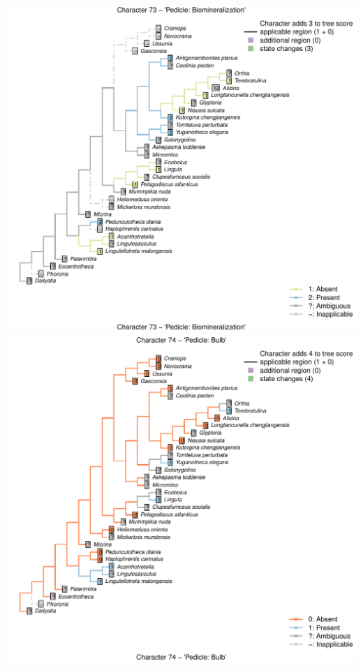 \documentclass[]{book}
\theoremstyle{definition}
\theoremstyle{definition}
\theoremstyle{definition}
\theoremstyle{remark}
\begin{document}
\includegraphics{Brachiopod_phylogeny_files/figure-latex/unnamed-chunk-4-73.pdf}
\includegraphics{Brachiopod_phylogeny_files/figure-latex/unnamed-chunk-4-74.pdf}
\end{document}
